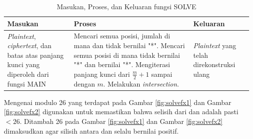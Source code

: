   \begin{table}[H]
	 	\caption{Masukan, Proses, dan Keluaran fungsi SOLVE}
		\begin{tabular}   {|p{2cm}|p{4.5cm}|p{2.5cm}|}\hline
		Masukan&Proses&Keluaran \\ \hline
		\textit{Plaintext}, \textit{ciphertext}, dan batas atas panjang kunci yang diperoleh dari fungsi MAIN&Mencari semua posisi, jumlah di mana \plaintext dan \ciphertext tidak bernilai "*". Mencari semua posisi di mana \ciphertext tidak bernilai "*" dan \plaintext bernilai "*". Mengiterasi panjang kunci dari $\frac{m}{2}+1$ sampai dengan $m$. Melakukan \textit{intersection}.  &\textit{Plaintext} yang telah direkonstruksi ulang \\ \hline
		\end{tabular}%
		\label{tab:iosolve}
	\end{table}

	Mengenai modulo 26 yang terdapat pada Gambar \ref{fig:solvefx1} dan Gambar \ref{fig:solvefx2} digunakan untuk memastikan bahwa selisih dari \plaintext dan \ciphertext adalah pasti $< 26$. Ditambah 26 pada Gambar \ref{fig:solvefx1} dan Gambar \ref{fig:solvefx2} dimaksudkan agar silisih antara \plaintext dan \ciphertext selalu bernilai positif.  
  
